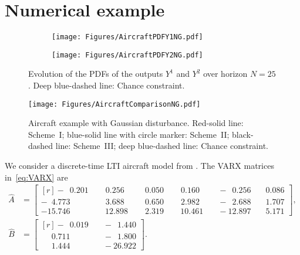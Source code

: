 \section{Numerical example} \label{sec:Simulation}
\begin{figure}[t]
	\begin{subfigure}{\linewidth}
		\centering
		\texttt{[image: Figures/AircraftPDFY1NG.pdf]}
	\end{subfigure}
	\begin{subfigure}{\linewidth}
		\centering
		\texttt{[image: Figures/AircraftPDFY2NG.pdf]}
	\end{subfigure}
	\caption{Evolution of the PDFs of the outputs $Y^1$ and $Y^2$ over horizon $N=25$. Deep blue-dashed line: Chance constraint.}
	\label{fig:AircraftY}
\end{figure}
\begin{figure}[t]
	\begin{center}
		\texttt{[image: Figures/AircraftComparisonNG.pdf]}
		\caption{Aircraft example with Gaussian disturbance. Red-solid line: Scheme~I; blue-solid line with circle marker: Scheme~II; black-dashed line: Scheme~III; deep blue-dashed line: Chance constraint.} \label{fig:AircraftComparison}		
	\end{center}
\end{figure}
We consider a discrete-time LTI aircraft model from \citet{pan24data}. The VARX matrices in~\eqref{eq:VARX} are
\begin{align*}
	\hat{A} &= \left[\begin{smallmatrix*}[r]
		-\phantom{0}0.201&	\phantom{-0}0.256&	\phantom{-0}0.050	&\phantom{-0}0.160&	\quad-\phantom{0}0.256&	\quad 0.086\\
		-\phantom{0}4.773&	\phantom{-0}3.688&	\phantom{-0}0.650&	\phantom{-0}2.982&	\quad-\phantom{0}2.688&	\quad 1.707\\
		-15.746&	\phantom{-}12.898&	\phantom{-0}2.319	&\phantom{-}10.461	&\quad-12.897	&\quad 5.171
	\end{smallmatrix*}\right],\\
	\hat{B} &= \left[\begin{smallmatrix*}[r] -\phantom{0}0.019	&\quad -\phantom{0}1.440\\
		\phantom{-0}0.711&\quad	-\phantom{0}1.800\\
		\phantom{-0}1.444&\quad	-26.922
	\end{smallmatrix*}\right].
\end{align*}
